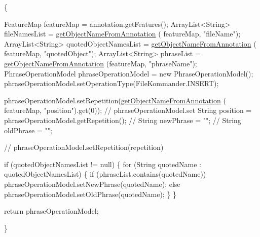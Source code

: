 \begin{DoxyCode}
                                                                               
        \{

        FeatureMap featureMap = annotation.getFeatures();
        ArrayList<String> fileNamesList = \hyperlink{classcom_1_1poly_1_1nlp_1_1filekommander_1_1file_1_1actions_1_1_analyse_action_a8652e1bba48585a8c416e6e212fe4766}{getObjectNameFromAnnotation}
      (
                featureMap, \textcolor{stringliteral}{"fileName"});
        ArrayList<String> quotedObjectNamesList = \hyperlink{classcom_1_1poly_1_1nlp_1_1filekommander_1_1file_1_1actions_1_1_analyse_action_a8652e1bba48585a8c416e6e212fe4766}{getObjectNameFromAnnotation}
      (
                featureMap, \textcolor{stringliteral}{"quotedObject"});
        ArrayList<String> phraseList = \hyperlink{classcom_1_1poly_1_1nlp_1_1filekommander_1_1file_1_1actions_1_1_analyse_action_a8652e1bba48585a8c416e6e212fe4766}{getObjectNameFromAnnotation}
      (featureMap,
                \textcolor{stringliteral}{"phraseName"});
        PhraseOperationModel phraseOperationModel = \textcolor{keyword}{new} PhraseOperationModel();
        phraseOperationModel.setOperationType(FileKommander.INSERT);

        phraseOperationModel.setRepetition(\hyperlink{classcom_1_1poly_1_1nlp_1_1filekommander_1_1file_1_1actions_1_1_analyse_action_a8652e1bba48585a8c416e6e212fe4766}{getObjectNameFromAnnotation}
      (
                featureMap, \textcolor{stringliteral}{"position"}).\textcolor{keyword}{get}(0));
        \textcolor{comment}{// phraseOperationModel.set}
        String position = phraseOperationModel.getRepetition();
        \textcolor{comment}{// String newPhrase = "";}
        \textcolor{comment}{// String oldPhrase = "";}

        \textcolor{comment}{// phraseOperationModel.setRepetition(repetition)}

        \textcolor{keywordflow}{if} (quotedObjectNamesList != null) \{
            \textcolor{keywordflow}{for} (String quotedName : quotedObjectNamesList) \{
                \textcolor{keywordflow}{if} (phraseList.contains(quotedName))
                    phraseOperationModel.setNewPhrase(quotedName);
                \textcolor{keywordflow}{else}
                    phraseOperationModel.setOldPhrase(quotedName);
            \}
        \}

        \textcolor{keywordflow}{return} phraseOperationModel;

    \}
\end{DoxyCode}
